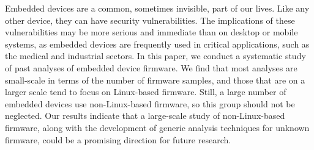Embedded devices are a common, sometimes invisible, part of our lives.
Like any other device, they can have security vulnerabilities.
The implications of these vulnerabilities may be more serious and immediate than on desktop or mobile systems, as embedded devices are frequently used in critical applications, such as the medical and industrial sectors.
In this paper, we conduct a systematic study of past analyses of embedded device firmware.
We find that most analyses are small-scale in terms of the number of firmware samples, and those that are on a larger scale tend to focus on Linux-based firmware.
Still, a large number of embedded devices use non-Linux-based firmware, so this group should not be neglected.
Our results indicate that a large-scale study of non-Linux-based firmware, along with the development of generic analysis techniques for unknown firmware, could be a promising direction for future research.
